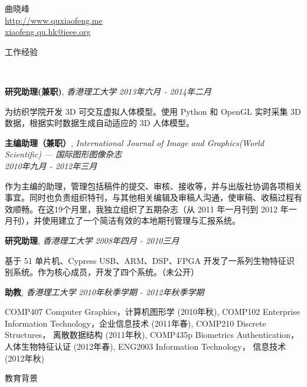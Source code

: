 \documentclass[9pt]{article}
\newenvironment{changemargin}[2]{%
  \begin{list}{}{%
    \setlength{\topsep}{0pt}%
    \setlength{\leftmargin}{#1}%
    \setlength{\rightmargin}{#2}%
    \setlength{\listparindent}{\parindent}%
    \setlength{\itemindent}{\parindent}%
    \setlength{\parsep}{\parskip}%
  }%
  \item[]}{\end{list}
}
\newcommand{\lineover}{
	\begin{changemargin}{-0.05in}{-0.05in}
		\vspace*{-8pt}
		\hrulefill \\
		\vspace*{-2pt}
	\end{changemargin}
}
\newcommand{\header}[1]{
	\begin{changemargin}{-0.5in}{-0.5in}
		\scshape{#1}\\
  	\lineover
	\end{changemargin}
}
\newcommand{\contact}[3]{
	\begin{changemargin}{-0.5in}{-0.5in}
		\begin{center}
			{\Large \scshape {#1}}\\ \smallskip
      {\url{#2}}\\ \smallskip 
      {\href{mailto:#3}{#3}}\\ \smallskip
		\end{center}
	\end{changemargin}
}
\newcommand{\jobtitle}[3]{
	\textbf{#1}, \emph{#2} \hfill \emph{#3}\\
}
\newcommand{\jobdescription}[1]{
	\begin{changemargin}{0.15in}{0.15in}
    \smallskip
		{#1}
    \medskip
	\end{changemargin}
}
\newenvironment{body} {
	\vspace*{-16pt}
	\begin{changemargin}{-0.25in}{-0.5in}
  }	
	{\end{changemargin}
}
\begin{document}
\contact{曲晓峰}{http://www.quxiaofeng.me}{xiaofeng.qu.hk@ieee.org}


\header{工作经验}

\begin{body}
  \vspace{14pt}

    \jobtitle{研究助理(兼职)}{香港理工大学}{2013年六月 - 2014年二月}
    \jobdescription{
        为纺织学院开发 3D 可交互虚拟人体模型。使用 Python 和 OpenGL 实时采集 3D 数据，根据实时数据生成自动适应的 3D 人体模型。
    }

    \jobtitle{主编助理（兼职）}{International Journal of Image and Graphics(World Scientific) --- 国际图形图像杂志\\}{2010年九月 - 2012年三月}
    \jobdescription{
        作为主编的助理，管理包括稿件的提交、审核、接收等，并与出版社协调各项相关事宜。同时也负责组织特刊，与其他相关编辑及审稿人沟通，使审稿、收稿过程有效顺畅。在这19个月里，我独立组织了五期杂志（从 2011 年一月刊到 2012 年一月刊），并使用建立了一个简洁有效的本地期刊管理与汇报系统。
    }

	\jobtitle{研究助理}{香港理工大学}{2008年四月 - 2010三月}
    \jobdescription{
        基于 51 单片机、Cypress USB、ARM、DSP、FPGA 开发了一系列生物特征识别系统。作为核心成员，开发了四个系统。（未公开）
    }

	\jobtitle{助教}{香港理工大学}{2010年秋季学期 - 2012年秋季学期}
    \jobdescription {
        COMP407 Computer Graphics，计算机图形学 (2010年秋),
        COMP102 Enterprise Information Technology，企业信息技术 (2011年春), 
        COMP210 Discrete Structures， 离散数据结构 (2011年秋),
        COMP435p Biometrics Authentication， 人体生物特征认证 (2012年春), 
        ENG2003 Information Technology， 信息技术 (2012年秋)
    }

\end{body}

\medskip


\header{教育背景}
\end{document}
